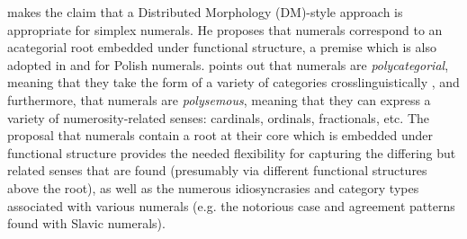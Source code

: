 \documentclass[output=paper]{langscibook}
\begin{document}
\citet[Ch. 3]{fehri2018numRoot} makes the claim that a Distributed Morphology (DM)-style approach is appropriate for simplex numerals. He proposes that numerals correspond to an acategorial root embedded under functional structure, a premise which is also adopted in \citet{klockmann2017semiLex} and \citet{wagiel2017several, wagiel2018fasl} for Polish numerals. \citet[61]{fehri2018numRoot} points out that numerals are \textit{polycategorial}, meaning that they  take the form of a variety of categories crosslinguistically \citep[see e.g.][section 3.4 for examples of nominal, adjectival, verbal, and mixed numerals]{ionin_matushansky2018cardinals}%
, and furthermore, that numerals are \textit{polysemous}, meaning that they can express a variety of numerosity-related senses: cardinals, ordinals, fractionals, etc. The proposal that numerals contain a root at their core which is embedded under functional structure provides the needed flexibility for capturing the differing but related senses that are found (presumably via different functional structures above the root), as well as the numerous idiosyncrasies and category types associated with various numerals (e.g. the notorious case and agreement patterns found with Slavic numerals).\largerpage 

\end{document}
